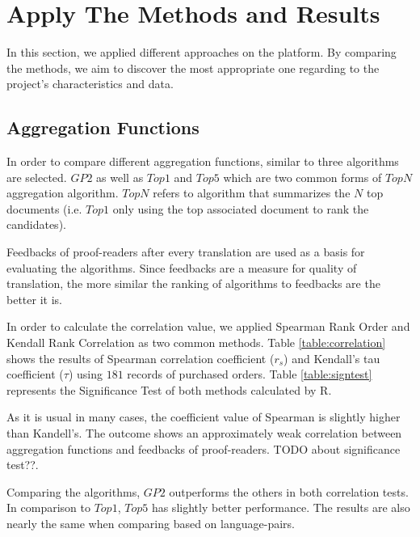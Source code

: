 \section{Apply The Methods and Results}
\label{sec:apply}
In this section, we applied different approaches on the platform. By comparing the methods, we aim to discover the most appropriate one regarding to the project's characteristics and data.

\subsection{Aggregation Functions}
In order to compare different aggregation functions, similar to \citet{agg-gp2} three algorithms are selected. $GP2$ as well as $Top1$ and $Top5$ which are two common forms of $TopN$ aggregation algorithm. $TopN$ refers to algorithm that summarizes the $N$ top documents (i.e. $Top1$ only using the top associated document to rank the candidates).

Feedbacks of proof-readers after every translation are used as a basis for evaluating the algorithms. Since feedbacks are a measure for quality of translation, the more similar the ranking of algorithms to feedbacks are the better it is. 

In order to calculate the correlation value, we applied Spearman Rank Order and Kendall Rank Correlation as two common methods. Table \ref{table:correlation} shows the results of Spearman correlation coefficient ($r_s$) and Kendall's tau coefficient ($\tau$) using $181$ records of purchased orders. Table \ref{table:signtest} represents the Significance Test of both methods calculated by R.

As it is usual in many cases, the coefficient value of Spearman is slightly higher than Kandell's. The outcome shows an approximately weak correlation between aggregation functions and feedbacks of proof-readers. TODO about significance test??.

Comparing the algorithms, $GP2$ outperforms the others in both correlation tests. In comparison to $Top1$, $Top5$ has slightly better performance. The results are also nearly the same when comparing based on language-pairs.

\begin{table}
\begin{center}
\caption{Correlation Test Between Algorithms and Proof-readers' Feedbacks}
\label{table:correlation}
\end{center}
\end{table}

